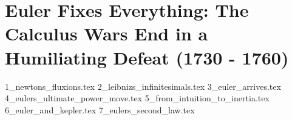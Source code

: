 \section{Euler Fixes Everything: The Calculus Wars End in a Humiliating Defeat (1730 - 1760)}  

{1_newtons_fluxions.tex}
{2_leibnizs_infinitesimals.tex}
{3_euler_arrives.tex}
{4_eulers_ultimate_power_move.tex}
{5_from_intuition_to_inertia.tex}
{6_euler_and_kepler.tex}
{7_eulers_second_law.tex}

